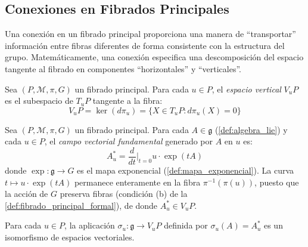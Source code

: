 \subsection{Conexiones en Fibrados Principales}\label{subsec:conexiones_fibrados}

Una conexión en un fibrado principal proporciona una manera de ``transportar'' información entre fibras diferentes de forma consistente con la estructura del grupo. Matemáticamente, una conexión especifica una descomposición del espacio tangente al fibrado en componentes ``horizontales'' y ``verticales''.

\begin{definition}\label{def:espacio_vertical}
Sea $(P, \mathcal{M}, \pi, G)$ un fibrado principal. Para cada $u \in P$, el \textit{espacio vertical} $V_u P$ es el subespacio de $T_u P$ tangente a la fibra:
\[
V_u P = \ker(d\pi_u) = \{X \in T_u P : d\pi_u(X) = 0\}
\]
\end{definition}

\begin{definition}\label{def:campo_vectorial_fundamental}
Sea $(P, \mathcal{M}, \pi, G)$ un fibrado principal. Para cada $A \in \mathfrak{g}$ (\autoref{def:algebra_lie}) y cada $u \in P$, el \textit{campo vectorial fundamental} generado por $A$ en $u$ es:
\[
A^*_u = \frac{d}{dt}\bigg|_{t=0} u \cdot \exp(tA)
\]
donde $\exp: \mathfrak{g} \to G$ es el mapa exponencial (\autoref{def:mapa_exponencial}). La curva $t \mapsto u \cdot \exp(tA)$ permanece enteramente en la fibra $\pi^{-1}(\pi(u))$, puesto que la acción de $G$ preserva fibras (condición (b) de la \autoref{def:fibrado_principal_formal}), de donde $A^*_u \in V_u P$.
\end{definition}

\begin{proposition}\label{prop:vertical_lie_isomorfismo}
Para cada $u \in P$, la aplicación $\sigma_u: \mathfrak{g} \to V_u P$ definida por $\sigma_u(A) = A^*_u$ es un isomorfismo de espacios vectoriales.
\end{proposition}

